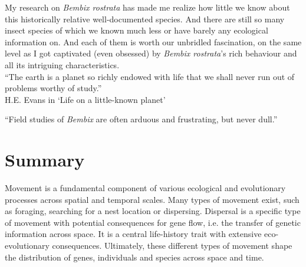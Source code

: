 \documentclass[10pt, twoside]{book} %
\renewcommand{\chaptermark}[1]{\markboth{#1}{}}
\newlength{\thumbheight}
\newlength{\thumbwidth}
\begin{document}
 	\vspace*{\fill}
 	\noindent My research on \textit{Bembix rostrata} has made me realize how little we know about this historically relative well-documented species. And there are still so many insect species of which we known much less or have barely any ecological information on. And each of them is worth our unbridled fascination, on the same level as I got captivated (even obsessed) by \textit{Bembix rostrata}'s rich behaviour and all its intriguing characteristics.\\
 	
 	\noindent ``The earth is a planet so richly endowed with life that we shall never run out of problems worthy of study.''\\
 	\hspace*{\fill} H.E. Evans in `Life on a little-known planet'
 	
 	\clearpage
\setlength{\thumbwidth}{0cm}
\setlength{\thumbheight}{0cm}



\thispagestyle{empty}		
\vspace*{8.00cm}
\begin{small}
	\noindent \begin{center}``Field studies of \textit{Bembix} are often arduous and frustrating, but never dull.''\\
		\end{center}
	\vspace*{0.2cm}
	\hspace*{\fill}\citet{evans1957}
\end{small}
\newpage



\thispagestyle{mainmatter} %
\chapter*{Summary}
\chaptermark{Summary}
Movement is a fundamental component of various ecological and evolutionary processes across spatial and temporal scales. Many types of movement exist, such as foraging, searching for a nest location or dispersing. Dispersal is a specific type of movement with potential consequences for gene flow, i.e. the transfer of genetic information across space. It is a central life-history trait with extensive eco-evolutionary consequences. Ultimately, these different types of movement shape the distribution of genes, individuals and species across space and time.\\
\end{document}
